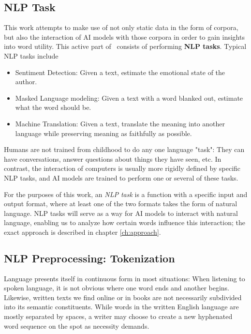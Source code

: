 \subsection{NLP Task}
This work attempts to make use of not only static data in the form of corpora, but also the interaction of AI models with those corpora in order to gain insights into word utility.
This active part of \NLP\ consists of performing \textbf{NLP tasks}.
Typical NLP tasks include \cite{jurafskySpeechLanguageProcessing2025}

\begin{itemize}
	\item Sentiment Detection: Given a text, estimate the emotional state of the author.
	\item Masked Language modeling: Given a text with a word blanked out, estimate what the word should be.
	\item Machine Translation: Given a text, translate the meaning into another language while preserving meaning as faithfully as possible.
\end{itemize}


Humans are not trained from childhood to do any one language "task":
They can have conversations, answer questions about things they have seen, etc.
In contrast, the interaction of computers is usually more rigidly defined by specific NLP tasks, and AI models are trained to perform one or several of these tasks.

For the purposes of this work, an \textit{NLP task} is a function with a specific input and output format, where at least one of the two formats takes the form of natural language.
NLP tasks will serve as a way for AI models to interact with natural language, enabling us to analyze how certain words influence this interaction; the exact approach is described in chapter \ref{ch:approach}.


\subsection{NLP Preprocessing: Tokenization}
Language presents itself in continuous form in most situations:
When listening to spoken language, it is not obvious where one word ends and another begins.
Likewise, written texts we find online or in books are not necessarily subdivided into its semantic constituents.
While words in the written English language are mostly separated by spaces, a writer may choose to create a new hyphenated word sequence on the spot as necessity demands.

